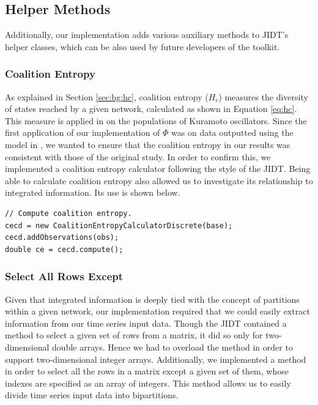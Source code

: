 \documentclass[a4paper,11pt]{article}
\begin{document}
\subsection{Helper Methods}
Additionally, our implementation adds various auxiliary methods to JIDT's helper classes, which can be also used by future developers of the toolkit.

\subsubsection{Coalition Entropy}
\label{sec:impl:hc}

As explained in Section \ref{sec:bg:hc}, coalition entropy ($H_c$) measures the diversity of states reached by a given network, calculated as shown in Equation \ref{eq:hc}. This measure is applied in \cite{Shanahan2010} on the populations of Kuramoto oscillators. Since the first application of our implementation of $\Phi$ was on data outputted using the model in \cite{Shanahan2010}, we wanted to ensure that the coalition entropy in our results was consistent with those of the original study. In order to confirm this, we implemented a coalition entropy calculator following the style of the JIDT. Being able to calculate coalition entropy also allowed us to investigate its relationship to integrated information. Its use is shown below.

\begin{verbatim}
// Compute coalition entropy.
cecd = new CoalitionEntropyCalculatorDiscrete(base);
cecd.addObservations(obs);
double ce = cecd.compute();
\end{verbatim}

\subsubsection{Select All Rows Except}

Given that integrated information is deeply tied with the concept of partitions within a given network, our implementation required that we could easily extract information from our time series input data. Though the JIDT contained a method to select a given set of rows from a matrix, it did so only for two-dimensional double arrays. Hence we had to overload the method in order to support two-dimensional integer arrays. Additionally, we implemented a method in order to select all the rows in a matrix except a given set of them, whose indexes are specified as an array of integers. This method allows us to easily divide time series input data into bipartitions. 
\end{document}
